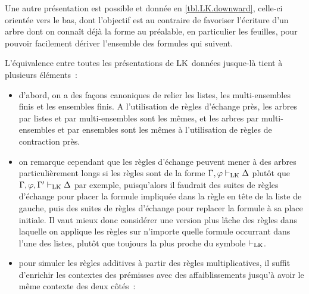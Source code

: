Une autre présentation est possible et donnée en \cref{tbl.LK.downward},
celle-ci orientée vers le bas, dont l'objectif est au contraire de favoriser
l'écriture d'un arbre dont on connaît déjà la forme au préalable, en
particulier les feuilles, pour pouvoir facilement dériver l'ensemble des
formules qui suivent.

L'équivalence entre toutes les présentations de $\operatorname{LK}$ données jusque-là tient à
plusieurs éléments~:
\begin{itemize}
\item d'abord, on a des façons canoniques de relier les listes, les
  multi-ensembles finis et les ensembles finis. A l'utilisation de règles
  d'échange près, les arbres par listes et par multi-ensembles sont les mêmes,
  et les arbres par multi-ensembles et par ensembles sont les mêmes à
  l'utilisation de règles de contraction près.
\item on remarque cependant que les
  règles d'échange peuvent mener à des arbres particulièrement longs si les
  règles sont de la forme $\Gamma,\varphi\vdash_{\operatorname{LK}}\Delta$ plutôt que
  $\Gamma,\varphi,\Gamma'\vdash_{\operatorname{LK}}\Delta$ par exemple, puisqu'alors il faudrait
  des suites de règles d'échange pour placer la formule impliquée dans la
  règle en tête de la liste de gauche, puis des suites de règles d'échange
  pour replacer la formule à sa place initiale. Il vaut mieux donc considérer
  une version plus lâche des règles dans laquelle on applique les règles sur
  n'importe quelle formule occurrant dans l'une des listes, plutôt que toujours
  la plus proche du symbole $\vdash_{\operatorname{LK}}$.
\item pour simuler les règles additives à partir des règles multiplicatives,
  il suffit d'enrichir les contextes des prémisses avec des affaiblissements
  jusqu'à avoir le même contexte des deux côtés~:
  \begin{center}
  \end{center}

\end{itemize}
